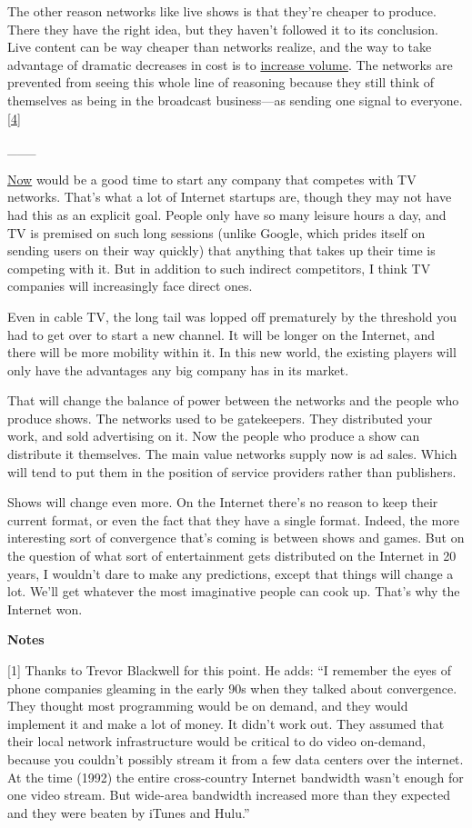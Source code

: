The other reason networks like live shows is that they're cheaper to
produce. There they have the right idea, but they haven't followed it to
its conclusion. Live content can be way cheaper than networks realize,
and the way to take advantage of dramatic decreases in cost is to
\href{http://justin.tv}{increase volume}. The networks are prevented
from seeing this whole line of reasoning because they still think of
themselves as being in the broadcast business---as sending one signal to
everyone. {[}\hyperref[f4n]{4}{]}

\_\_\_

\href{badeconomy.html}{Now} would be a good time to start any company
that competes with TV networks. That's what a lot of Internet startups
are, though they may not have had this as an explicit goal. People only
have so many leisure hours a day, and TV is premised on such long
sessions (unlike Google, which prides itself on sending users on their
way quickly) that anything that takes up their time is competing with
it. But in addition to such indirect competitors, I think TV companies
will increasingly face direct ones.

Even in cable TV, the long tail was lopped off prematurely by the
threshold you had to get over to start a new channel. It will be longer
on the Internet, and there will be more mobility within it. In this new
world, the existing players will only have the advantages any big
company has in its market.

That will change the balance of power between the networks and the
people who produce shows. The networks used to be gatekeepers. They
distributed your work, and sold advertising on it. Now the people who
produce a show can distribute it themselves. The main value networks
supply now is ad sales. Which will tend to put them in the position of
service providers rather than publishers.

Shows will change even more. On the Internet there's no reason to keep
their current format, or even the fact that they have a single format.
Indeed, the more interesting sort of convergence that's coming is
between shows and games. But on the question of what sort of
entertainment gets distributed on the Internet in 20 years, I wouldn't
dare to make any predictions, except that things will change a lot.
We'll get whatever the most imaginative people can cook up. That's why
the Internet won.

\textbf{Notes}

{[}1{]} Thanks to Trevor Blackwell for this point. He adds: ``I remember
the eyes of phone companies gleaming in the early 90s when they talked
about convergence. They thought most programming would be on demand, and
they would implement it and make a lot of money. It didn't work out.
They assumed that their local network infrastructure would be critical
to do video on-demand, because you couldn't possibly stream it from a
few data centers over the internet. At the time (1992) the entire
cross-country Internet bandwidth wasn't enough for one video stream. But
wide-area bandwidth increased more than they expected and they were
beaten by iTunes and Hulu.''

